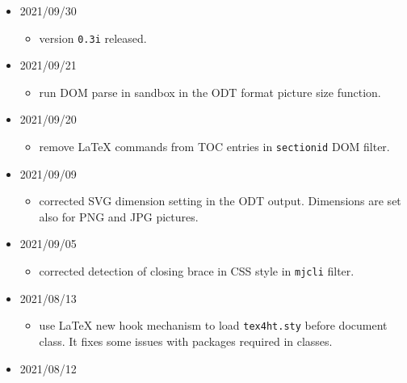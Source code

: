\begin{itemize}
  \begin{itemize}
  \tightlist
  \item
    fixed wrong DOM object name in the ODT format.
  \item
    add addtional \texttt{\textless{}mrow\textgreater{}} elements when
    necessary.
  \end{itemize}
\item
  2021/09/30

  \begin{itemize}
  \tightlist
  \item
    version \texttt{0.3i} released.
  \end{itemize}
\item
  2021/09/21

  \begin{itemize}
  \tightlist
  \item
    run DOM parse in sandbox in the ODT format picture size function.
  \end{itemize}
\item
  2021/09/20

  \begin{itemize}
  \tightlist
  \item
    remove LaTeX commands from TOC entries in \texttt{sectionid} DOM
    filter.
  \end{itemize}
\item
  2021/09/09

  \begin{itemize}
  \tightlist
  \item
    corrected SVG dimension setting in the ODT output. Dimensions are
    set also for PNG and JPG pictures.
  \end{itemize}
\item
  2021/09/05

  \begin{itemize}
  \tightlist
  \item
    corrected detection of closing brace in CSS style in \texttt{mjcli}
    filter.
  \end{itemize}
\item
  2021/08/13

  \begin{itemize}
  \tightlist
  \item
    use LaTeX new hook mechanism to load \texttt{tex4ht.sty} before
    document class. It fixes some issues with packages required in
    classes.
  \end{itemize}
\item
  2021/08/12


\end{itemize}
